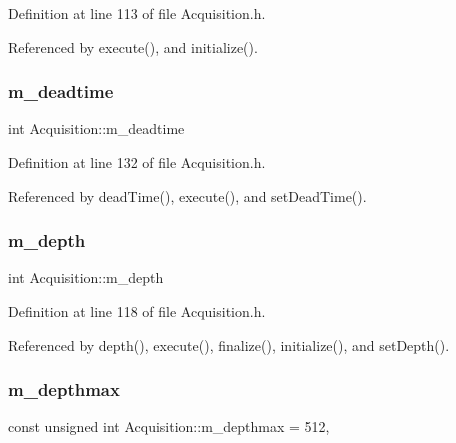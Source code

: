Definition at line 113 of file Acquisition.\+h.



Referenced by execute(), and initialize().

\mbox{\label{classAcquisition_a5f7fe20506e7d860ed61935255adfe17}} 
\subsubsection{\texorpdfstring{m\+\_\+deadtime}{m\_deadtime}}
{\footnotesize\ttfamily int Acquisition\+::m\+\_\+deadtime\hspace{0.3cm}{\ttfamily [private]}}



Definition at line 132 of file Acquisition.\+h.



Referenced by dead\+Time(), execute(), and set\+Dead\+Time().

\mbox{\label{classAcquisition_a26628424533a2dd74d24712a14637a72}} 
\subsubsection{\texorpdfstring{m\+\_\+depth}{m\_depth}}
{\footnotesize\ttfamily int Acquisition\+::m\+\_\+depth\hspace{0.3cm}{\ttfamily [private]}}



Definition at line 118 of file Acquisition.\+h.



Referenced by depth(), execute(), finalize(), initialize(), and set\+Depth().

\mbox{\label{classAcquisition_a7d95ba9a5593451a73754ed44f6bcd1c}} 
\subsubsection{\texorpdfstring{m\+\_\+depthmax}{m\_depthmax}}
{\footnotesize\ttfamily const unsigned int Acquisition\+::m\+\_\+depthmax = 512\hspace{0.3cm}{\ttfamily [static]}, {\ttfamily [private]}}



